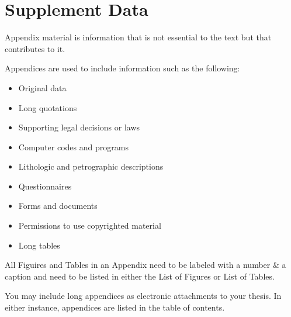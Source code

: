 
\chapter{Supplement Data}

Appendix material is information that is not
essential to the text but that contributes to it.

Appendices are used to include information such as the following:

\begin{itemize}
	\item Original data
	\item Long quotations 
	\item Supporting legal decisions or laws 
	\item Computer codes and programs 
	\item Lithologic and petrographic descriptions
	\item Questionnaires 	
	\item Forms and documents 
	\item Permissions to use copyrighted material
	\item Long tables
\end{itemize}


All Figuires and  Tables in an Appendix need to be labeled with a number \& a caption and need to be listed in either the List of Figures or List of Tables.

You may include long appendices as electronic attachments to your thesis. In either instance, appendices are listed in the table of contents.